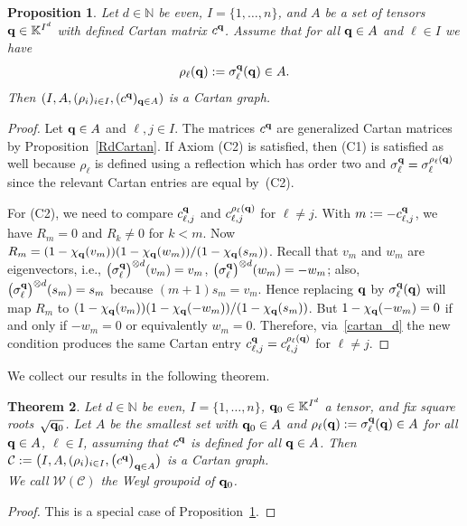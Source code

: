 \documentclass[10pt,a4paper]{amsart}
\numberwithin{equation}{section}
\newtheorem{Theorem}{Theorem}[section]
\newtheorem{Proposition}[Theorem]{Proposition}
\newcommand{\NN }{\mathbb{N}}
\newcommand{\Cc }{\mathcal{C}}
\newcommand{\Wg }{\mathcal{W}}
\newcommand{\qq }{{\bf q}}
\newcommand{\KK }{\mathbb{K}}
\newcommand{\dn }{d}
\newcommand{\bich }{\chi}
\begin{document}
\begin{Proposition}\label{RdGraph}
Let $\dn\in \NN$ be even, $I=\{1,\dots,n\}$, and
$A$ be a set of tensors $\qq\in \KK^{I^\dn}$ with defined Cartan matrix $c^\qq$.
Assume that for all $\qq\in A$ and $\ell\in I$ we have
\[ \rho_\ell(\qq):=\sigma^{\qq}_\ell (\qq) \in A. \]
Then $(I,A,(\rho_i)_{i\in I},(c^\qq)_{\qq\in A})$ is a Cartan graph.
\end{Proposition}
\begin{proof}
Let $\qq\in A$ and $\ell,j \in I$.
The matrices $c^\qq$ are generalized Cartan matrices by Proposition~\ref{RdCartan}.
If Axiom (C2) is satisfied, then (C1) is satisfied as well because $\rho_\ell$ is defined using a reflection which has order two and $\sigma^{\qq}_\ell = \sigma^{\rho_\ell(\qq)}_\ell$ since the relevant Cartan entries are equal by~(C2).

For (C2), we need to compare $c^\qq_{\ell,j}$ and $c^{\rho_\ell(\qq)}_{\ell,j}$ for $\ell\ne j$.
With $m:=-c^\qq_{\ell,j}$, we have $R_m=0$ and $R_k\ne 0$ for $k<m$.
Now $R_m = (1-\bich_\qq(v_m))(1-\bich_\qq(w_m))/(1-\chi_\qq(s_m))$.
Recall that $v_m$ and $w_m$ are eigenvectors, i.e., $\big(\sigma^{\qq}_\ell\big)^{\otimes \dn}(v_m) = v_m$,
$\big(\sigma^{\qq}_\ell\big)^{\otimes \dn}(w_m) = -w_m$;
also, $\big(\sigma^{\qq}_\ell\big)^{\otimes \dn}(s_m) = s_m$ because $(m+1)s_m=v_m$.
Hence replacing $\qq$ by $\sigma^{\qq}_\ell (\qq)$ will map $R_m$ to
$(1-\bich_\qq(v_m))(1-\bich_\qq(-w_m))/(1-\chi_\qq(s_m))$.
But $1-\bich_\qq(-w_m)=0$ if and only if $-w_m=0$ or equivalently $w_m=0$.
Therefore, via~\eqref{cartan_d} the new condition produces the same Cartan entry
$c^\qq_{\ell,j}=c^{\rho_\ell(\qq)}_{\ell,j}$ for $\ell\ne j$.
\end{proof}

We collect our results in the following theorem.

\begin{Theorem}\label{wg_from_q}
Let $\dn\in \NN$ be even, $I=\{1,\dots,n\}$, $\qq_0\in \KK^{I^\dn}$ a tensor, and fix square roots~$\sqrt{\qq_0}$.
Let $A$ be the smallest set with $\qq_0\in A$ and $\rho_\ell(\qq):=\sigma^{\qq}_\ell (\qq)\in A$ for all $\qq\in A$, $\ell\in I$,
assuming that $c^\qq$ is defined for all $\qq\in A$.
Then
$\Cc:=\big(I,A,(\rho_i)_{i\in I},\big(c^\qq\big)_{\qq\in A}\big)$ is a Cartan graph.
\\
We call $\Wg(\Cc)$ the {\it Weyl groupoid} of $\qq_0$.
\end{Theorem}

\begin{proof}
This is a special case of Proposition~\ref{RdGraph}.
\end{proof}
\end{document}
